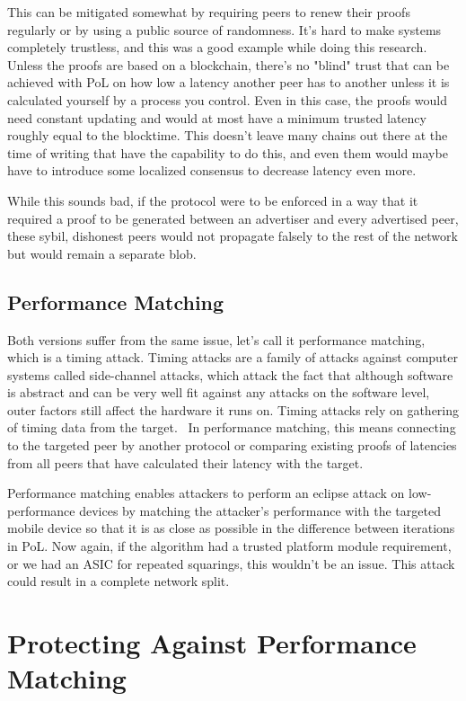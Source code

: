 This can be mitigated somewhat by requiring peers to renew their proofs regularly or by using a public source of randomness. It's hard to make systems completely trustless, and this was a good example while doing this research. Unless the proofs are based on a blockchain, there's no "blind" trust that can be achieved with PoL on how low a latency another peer has to another unless it is calculated yourself by a process you control. Even in this case, the proofs would need constant updating and would at most have a minimum trusted latency roughly equal to the blocktime. This doesn't leave many chains out there at the time of writing that have the capability to do this, and even them would maybe have to introduce some localized consensus to decrease latency even more.


While this sounds bad, if the protocol were to be enforced in a way that it required a proof to be generated between an advertiser and every advertised peer, these sybil, dishonest peers would not propagate falsely to the rest of the network but would remain a separate blob.

\subsection{Performance Matching}
Both versions suffer from the same issue, let's call it performance matching, which is a timing attack. Timing attacks are a family of attacks against computer systems called side-channel attacks, which attack the fact that although software is abstract and can be very well fit against any attacks on the software level, outer factors still affect the hardware it runs on. Timing attacks rely on gathering of timing data from the target.~\cite{noauthor_undated-mp} In performance matching, this means connecting to the targeted peer by another protocol or comparing existing proofs of latencies from all peers that have calculated their latency with the target.

Performance matching enables attackers to perform an eclipse attack on low-performance devices by matching the attacker's performance with the targeted mobile device so that it is as close as possible in the difference between iterations in PoL. Now again, if the algorithm had a trusted platform module requirement, or we had an ASIC for repeated squarings, this wouldn't be an issue. This attack could result in a complete network split.

\section{Protecting Against Performance Matching}

